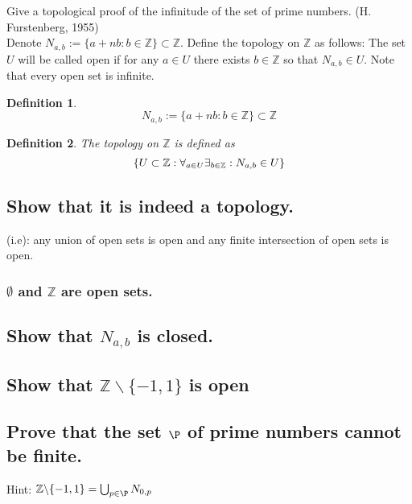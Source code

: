 \documentclass[]{article}
\newcommand{\Z}{\mathbb{Z}}
\newtheorem{definition}{Definition}
\begin{document}
\newpage
\section{}
Give a topological proof of the infinitude of the set of prime numbers. (H. Furstenberg, 1955)\\
Denote $N_{a,b} := \{a + nb : b \in \Z\} \subset \Z$. Define the topology on $\Z$ as follows: 
The set $U$ will be called open if for any $a \in U$ there exists $b \in \Z$ so that 
$N_{a,b} \in U$. Note that every open set is infinite.

\begin{definition}
    $$N_{a,b} := \{a + nb : b \in \Z\} \subset \Z$$
\end{definition}
\begin{definition}
    The topology on $\Z$ is defined as
    $$\qty{U \subset \Z : \forall_{a\in U} \exists_{b\in \Z}: N_{a,b} \in U}$$
\end{definition}

\subsection{Show that it is indeed a topology.}
(i.e): any union of open sets is open and any finite intersection of open sets is open.
\subsubsection{$\emptyset$ and $\Z$ are open sets.}
\subsubsection{}


\subsection{Show that $N_{a,b}$ is closed.}



\subsection{Show that $\Z \backslash \{-1,1\}$ is open}




\subsection{Prove that the set $\P$ of prime numbers cannot be finite.}
Hint: $\Z \backslash \{-1,1\} = \bigcup_{p \in \P} N_{0,p}$
\end{document}

